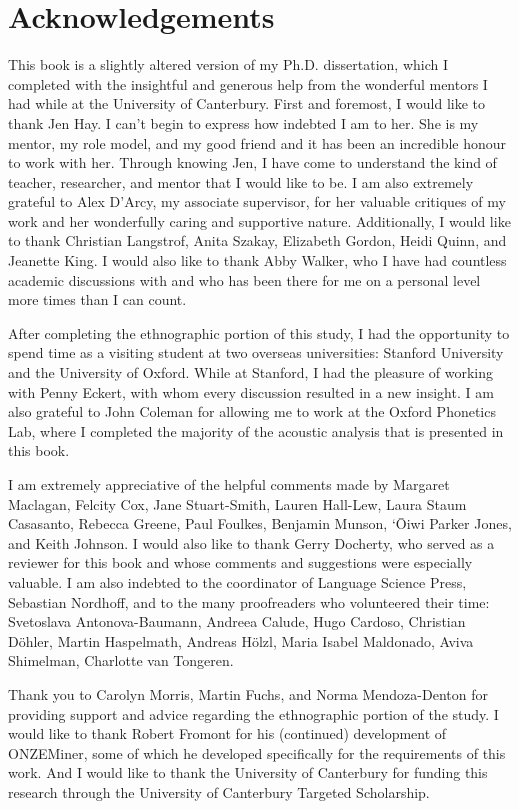 \section*{Acknowledgements}

\noindent This book is a slightly altered version of my Ph.D. dissertation, which I completed with the insightful and generous help from the wonderful mentors I had while at the University of Canterbury.  First and foremost, I would like to thank Jen Hay.  I can't begin to express how indebted I am to her.  She is my mentor, my role model, and my good friend and it has been an incredible honour to work with her.  Through knowing Jen, I have come to understand the kind of teacher, researcher, and mentor that I would like to be.  I am also extremely grateful to Alex D'Arcy, my associate supervisor, for her valuable critiques of my work and her wonderfully caring and supportive nature.  Additionally, I would like to thank Christian Langstrof, Anita Szakay, Elizabeth Gordon, Heidi Quinn, and Jeanette King.  I would also like to thank Abby Walker, who I have had countless academic discussions with and who has been there for me on a personal level more times than I can count.

After completing the ethnographic portion of this study, I had the opportunity to spend time as a visiting student at two overseas universities: Stanford University and the University of Oxford.  While at Stanford, I had the pleasure of working with Penny Eckert, with whom every discussion resulted in a new insight.  I am also grateful to John Coleman for allowing me to work at the Oxford Phonetics Lab, where I completed the majority of the acoustic analysis that is presented in this book.  

I am extremely appreciative of the helpful comments made by Margaret Maclagan, Felcity Cox, Jane Stuart-Smith, Lauren Hall-Lew, Laura Staum Casasanto, Rebecca Greene, Paul Foulkes, Benjamin Munson, `\=Oiwi Parker Jones, and Keith Johnson.  I would also like to thank Gerry Docherty, who served as a reviewer for this book and whose comments and suggestions were especially valuable. I am also indebted to the coordinator of Language Science Press, Sebastian Nordhoff, and to the many proofreaders who volunteered their time: Svetoslava Antonova-Baumann, Andreea Calude, Hugo Cardoso, Christian D\"{o}hler, Martin Haspelmath, Andreas H\"{o}lzl, Maria Isabel Maldonado, Aviva Shimelman, Charlotte van Tongeren.
 
Thank you to Carolyn Morris, Martin Fuchs, and Norma Men\-doza-Den\-ton for providing support and advice regarding the ethnographic portion of the study.  I would like to thank Robert Fromont for his (continued) development of ONZEMiner, some of which he developed specifically for the requirements of this work.  And I would like to thank the University of Canterbury for funding this research through the University of Canterbury Targeted Scholarship.

